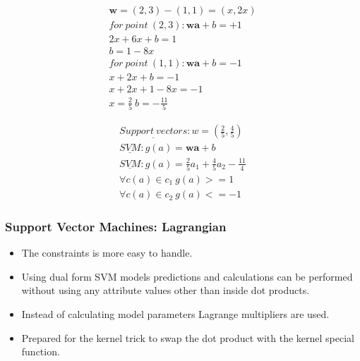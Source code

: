 \documentclass[proffesionalfonts]{beamer}
\begin{document}
\begin{frame}
\begin{minipage}[t]{.45\textwidth}
\end{minipage}
\begin{minipage}[t]{.45\textwidth}
\tiny
    \begin{eqnarray}
	  \mathbf w = (2,3) - (1,1) = (x, 2x) \\
      for\ point\ (2,3): \mathbf w \mathbf a + b = +1 \\
	   2x + 6x + b = 1 \\
	   b = 1 - 8x \\
      for\ point\ (1,1): \mathbf w \mathbf a + b = -1 \\
	   x + 2x + b = -1 \\
	   x + 2x + 1 - 8x = -1 \\
	   x = \frac{2}{5}\ b = -\frac{11}{5}
    \end{eqnarray}
\end{minipage}
\begin{minipage}[t]{.45\textwidth}
\tiny
    \begin{eqnarray}
	\underline{Support\ vectors}: w = (\frac{2}{5},\frac{4}{5}) \\
	\underline{SVM}: g(a) = \mathbf w \mathbf a + b \\
	\underline{SVM}: g(a) = \frac{2}{5}a_1+\frac{4}{5}a_2-\frac{11}{4} \\
	\forall{c(a)\in c_1}\  g(a) >= 1 \\
	\forall{c(a)\in c_2}\  g(a) <= -1 
    \end{eqnarray} 
\end{minipage}
\end{frame}

\begin{frame}
\frametitle{Support Vector Machines: Lagrangian}
  \begin{itemize}
  \item The constraints is more easy to handle.
  \item Using dual form SVM models predictions and calculations can be performed without using any attribute values other than inside dot products.
  \item Instead of calculating model parameters Lagrange multipliers are used.
  \item Prepared for the kernel trick to swap the dot product with the kernel special function.
  \end{itemize}
\end{frame}
\end{document}
